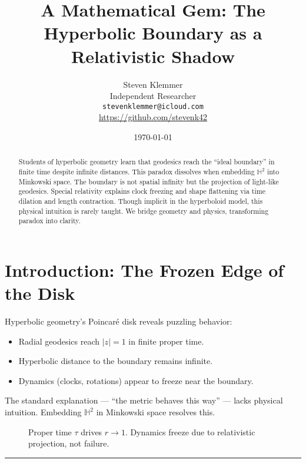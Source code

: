 \documentclass[10pt]{article}
\title{A Mathematical Gem: The Hyperbolic Boundary as a Relativistic Shadow}
\author{Steven Klemmer\\
\small Independent Researcher\\
\small \texttt{stevenklemmer@icloud.com}\\
\small \url{https://github.com/stevenk42}}
\date{\today}
\begin{document}
\maketitle

\begin{abstract}
Students of hyperbolic geometry learn that geodesics reach the ``ideal boundary'' in finite time despite infinite distances. This paradox dissolves when embedding $\mathbb{H}^2$ into Minkowski space. The boundary is not spatial infinity but the projection of light-like geodesics. Special relativity explains clock freezing and shape flattening via time dilation and length contraction. Though implicit in the hyperboloid model, this physical intuition is rarely taught. We bridge geometry and physics, transforming paradox into clarity.
\end{abstract}

\section{Introduction: The Frozen Edge of the Disk}

Hyperbolic geometry's Poincaré disk reveals puzzling behavior:
\begin{itemize}
    \item Radial geodesics reach $|z| = 1$ in finite proper time.
    \item Hyperbolic distance to the boundary remains infinite.
    \item Dynamics (clocks, rotations) appear to freeze near the boundary.
\end{itemize}

The standard explanation --- ``the metric behaves this way'' --- lacks physical intuition. Embedding $\mathbb{H}^2$ in Minkowski space resolves this.

\begin{figure}[H]
\centering
{}
\caption{Proper time $\tau$ drives $r \to 1$. Dynamics freeze due to relativistic projection, not failure.}
\label{fig:radial_flow}
\end{figure}
\noindent\rule{16.5cm}{0.4pt}
\end{document}
